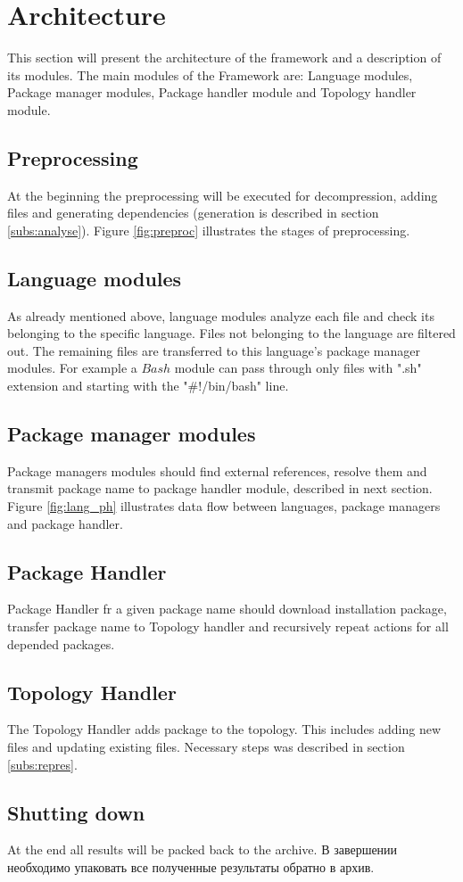 \section{Architecture}\label{sec:arch}
This section will present the architecture of the framework and a description of its modules.
The main modules of the Framework are: Language modules, Package manager modules, Package handler module and Topology handler module.

\subsection{Preprocessing}
At the beginning the preprocessing will be executed for decompression, adding files and generating dependencies (generation is described in section \ref{subs:analyse}).
Figure \ref{fig:preproc} illustrates the stages of preprocessing.

\subsection{Language modules}
As already mentioned above, language modules analyze each file and check its belonging to the specific language. 
Files not belonging to the language are filtered out.
The remaining files are transferred to this language's package manager modules.
For example a $Bash$ module can pass through only files with ".sh" extension and starting with the "\#!/bin/bash" line.
\subsection{Package manager modules}
Package managers modules should find external references, resolve them and transmit package name to package handler module, described in next section.
Figure \ref{fig:lang_ph} illustrates data flow between languages, package managers and package handler.


\subsection{Package Handler}
Package Handler fr a given package name should download installation package, transfer package name to Topology handler and recursively repeat actions for all depended packages.

\subsection{Topology Handler}
The Topology Handler adds package to the topology. 
This includes adding new files and updating existing files. 
Necessary steps was described in section \ref{subs:repres}.

\subsection{Shutting down}
At the end all results will be packed back to the archive.
В завершении необходимо упаковать все полученные результаты обратно в архив.



\fi
